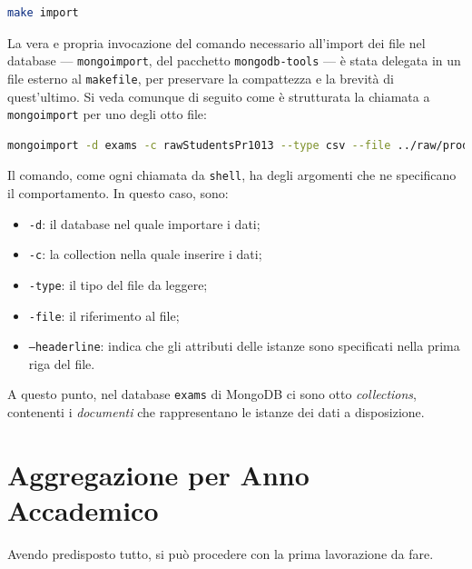 		\begin{lstlisting}[language=bash,caption={importazione dei dati in MongoDB}]
			make import
		\end{lstlisting}

		\vspace{0.3cm}

		La vera e propria invocazione del comando necessario all'import dei file nel database --- \texttt{mongoimport}, del pacchetto \texttt{mongodb-tools} --- è stata delegata in un file esterno al \texttt{makefile}, per preservare la compattezza e la brevità di quest'ultimo. Si veda comunque di seguito come è strutturata la chiamata a \texttt{mongoimport} per uno degli otto file:

		\begin{lstlisting}[language=bash,caption={dettaglio dell'importazione dei dati in MongoDB}]
			mongoimport -d exams -c rawStudentsPr1013 --type csv --file ../raw/prod_stud_10-11-12-13.csv --headerline
		\end{lstlisting}

		\vspace{0.3cm}

		Il comando, come ogni chiamata da \texttt{shell}, ha degli argomenti che ne specificano il comportamento. In questo caso, sono:

		\begin{itemize}
			\item \texttt{-d}: il database nel quale importare i dati;
			\item \texttt{-c}: la collection nella quale inserire i dati;
			\item \texttt{-type}: il tipo del file da leggere;
			\item \texttt{-file}: il riferimento al file;
			\item \texttt{--headerline}: indica che gli attributi delle istanze sono specificati nella prima riga del file.
		\end{itemize}

		A questo punto, nel database \texttt{exams} di MongoDB ci sono otto \textit{collections}, contenenti i \textit{documenti} che rappresentano le istanze dei dati a disposizione.

\section{Aggregazione per Anno Accademico}

	Avendo predisposto tutto, si può procedere con la prima lavorazione da fare. \\
	

